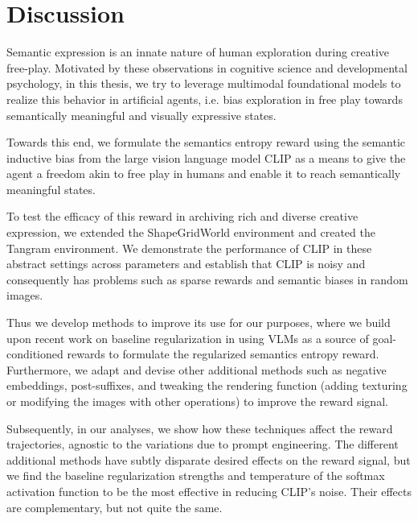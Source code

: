 \chapter{Discussion}
\label{sec:discussion}

Semantic expression is an innate nature of human exploration during creative free-play.
Motivated by these observations in cognitive science and developmental psychology, in this thesis, we try to leverage multimodal foundational models to realize this behavior in artificial agents, i.e. bias exploration in free play towards semantically meaningful and visually expressive states.

Towards this end, we formulate the semantics entropy reward using the semantic inductive bias from the large vision language model CLIP as a means to give the agent a freedom akin to free play in humans and enable it to reach semantically meaningful states.

To test the efficacy of this reward in archiving rich and diverse creative expression, we extended the ShapeGridWorld environment and created the Tangram environment.
We demonstrate the performance of CLIP in these abstract settings across parameters and establish that CLIP is noisy and consequently has problems such as sparse rewards and semantic biases in random images.

Thus we develop methods to improve its use for our purposes, where we build upon recent work on baseline regularization in using VLMs as a source of goal-conditioned rewards to formulate the regularized semantics entropy reward.
Furthermore, we adapt and devise other additional methods such as negative embeddings, post-suffixes, and tweaking the rendering function (adding texturing or modifying the images with other operations) to improve the reward signal.

Subsequently, in our analyses, we show how these techniques affect the reward trajectories, agnostic to the variations due to prompt engineering.
The different additional methods have subtly disparate desired effects on the reward signal, but we find the baseline regularization strengths and temperature of the softmax activation function to be the most effective in reducing CLIP's noise.
Their effects are complementary, but not quite the same.

